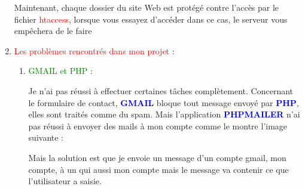 \documentclass{article}
\begin{document}
\begin{enumerate}
\vspace{0.7cm}
Maintenant, chaque dossier du site Web est protégé contre l'accès par le fichier \textcolor{red}{htaccess}, lorsque vous essayez d'accéder dans ce cas, le serveur vous empêchera de le faire

\hspace*{-0.7in}
               \noindent{} 


 
  
  \vspace{3cm}
\item \textcolor{red}{\huge Les problèmes rencontrés dans mon projet} :
\begin{enumerate}
\item    \textcolor{green}{ GMAIL et PHP} :

   \vspace{0.4cm}
                \setlength{\parindent}{1cm} Je n'ai pas réussi à effectuer certaines tâches complètement. Concernant le formulaire de contact, \textcolor{blue}{\textbf{GMAIL}} bloque tout message envoyé par \textcolor{blue}{\textbf{PHP}}, elles sont traités comme du spam. Mais l'application \textcolor{blue}{\textbf{PHPMAILER}} n'ai pas réussi à envoyer des mails à mon compte  comme le montre l'image suivante :
   
   \vspace{0.6cm}
   \hspace*{-1.05in}
               \noindent{}
               \vspace{0.4cm}
               Mais la solution est que je envoie un message d'un compte gmail, mon compte, à un qui aussi mon compte mais le message va contenir ce que l'utilisateur a saisie.
  

\end{enumerate}
\end{enumerate}
\end{document}
